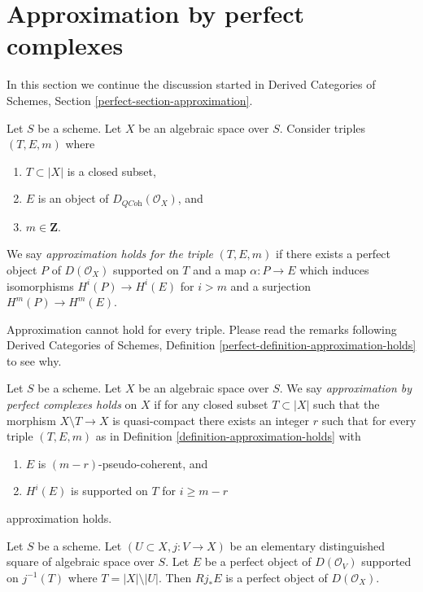 \section{Approximation by perfect complexes}
\label{section-approximation}

\noindent
In this section we continue the discussion started in
Derived Categories of Schemes, Section \ref{perfect-section-approximation}.

\begin{definition}
\label{definition-approximation-holds}
Let $S$ be a scheme. Let $X$ be an algebraic space over $S$.
Consider triples $(T, E, m)$ where
\begin{enumerate}
\item $T \subset |X|$ is a closed subset,
\item $E$ is an object of $D_{\textit{QCoh}}(\mathcal{O}_X)$, and
\item $m \in \mathbf{Z}$.
\end{enumerate}
We say {\it approximation holds for the triple} $(T, E, m)$ if
there exists a perfect object $P$ of $D(\mathcal{O}_X)$ supported on $T$
and a map $\alpha : P \to E$ which induces isomorphisms $H^i(P) \to H^i(E)$
for $i > m$ and a surjection $H^m(P) \to H^m(E)$.
\end{definition}

\noindent
Approximation cannot hold for every triple. Please read the remarks following
Derived Categories of Schemes, Definition
\ref{perfect-definition-approximation-holds} to see why.

\begin{definition}
\label{definition-approximation}
Let $S$ be a scheme. Let $X$ be an algebraic space over $S$.
We say {\it approximation by perfect complexes holds}
on $X$ if for any closed subset $T \subset |X|$ such that
the morphism $X \setminus T \to X$ is quasi-compact
there exists an integer $r$ such that for every triple $(T, E, m)$ as in
Definition \ref{definition-approximation-holds} with
\begin{enumerate}
\item $E$ is $(m - r)$-pseudo-coherent, and
\item $H^i(E)$ is supported on $T$ for $i \geq m - r$
\end{enumerate}
approximation holds.
\end{definition}

\begin{lemma}
\label{lemma-pushforward-perfect}
Let $S$ be a scheme. Let $(U \subset X, j : V \to X)$ be an
elementary distinguished square of algebraic space over $S$.
Let $E$ be a perfect object of $D(\mathcal{O}_V)$ supported on
$j^{-1}(T)$ where $T = |X| \setminus |U|$. Then $Rj_*E$ is a
perfect object of $D(\mathcal{O}_X)$.
\end{lemma}

